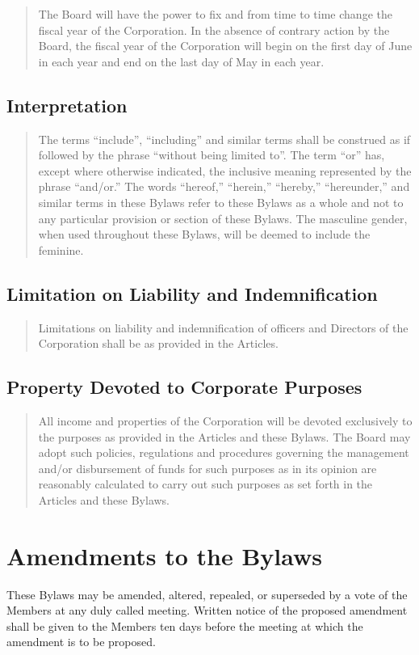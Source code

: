 \documentclass[
]{book}
\begin{document}
\begin{quote}
The Board will have the power to fix and from time to time change the
fiscal year of the Corporation. In the absence of contrary action by
the Board, the fiscal year of the Corporation will begin on the first
day of June in each year and end on the last day of May in each year.
\end{quote}

\section{Interpretation}\label{interpretation}

\begin{quote}
The terms ``include'', ``including'' and similar terms shall be construed
as if followed by the phrase ``without being limited to''. The term ``or''
has, except where otherwise indicated, the inclusive meaning
represented by the phrase ``and/or.'' The words ``hereof,'' ``herein,''
``hereby,'' ``hereunder,'' and similar terms in these Bylaws refer to
these Bylaws as a whole and not to any particular provision or section
of these Bylaws. The masculine gender, when used throughout these
Bylaws, will be deemed to include the feminine.
\end{quote}

\section{Limitation on Liability and Indemnification}\label{limitation-on-liability-and-indemnification}

\begin{quote}
Limitations on liability and indemnification of officers and Directors
of the Corporation shall be as provided in the Articles.
\end{quote}

\section{Property Devoted to Corporate Purposes}\label{property-devoted-to-corporate-purposes}

\begin{quote}
All income and properties of the Corporation will be devoted
exclusively to the purposes as provided in the Articles and these
Bylaws. The Board may adopt such policies, regulations and procedures
governing the management and/or disbursement of funds for such
purposes as in its opinion are reasonably calculated to carry out such
purposes as set forth in the Articles and these Bylaws.
\end{quote}

\chapter{Amendments to the Bylaws}\label{amendments-to-the-bylaws}

These Bylaws may be amended, altered, repealed, or superseded by a vote
of the Members at any duly called meeting. Written notice of the
proposed amendment shall be given to the Members ten days before the
meeting at which the amendment is to be proposed.
\end{document}

